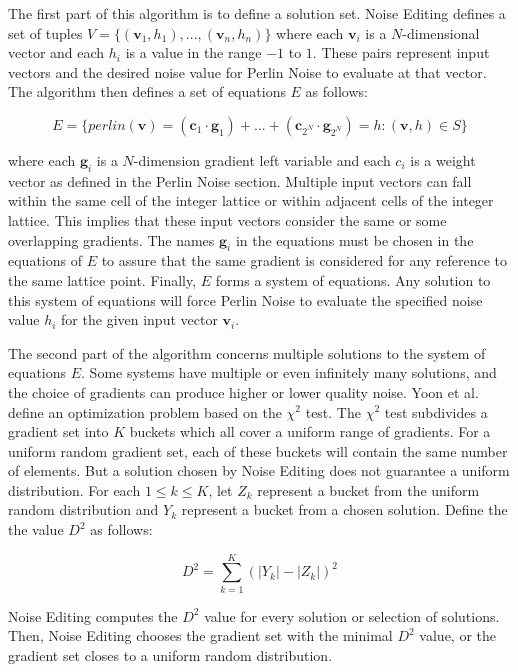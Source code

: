 \documentclass[12pt]{article}
\theoremstyle{definition}
\theoremstyle{remark}
\begin{document}
The first part of this algorithm is to define a solution set. Noise Editing defines a set of tuples $V = \{ (\textbf{v}_1, h_1), ..., (\textbf{v}_n, h_n) \}$ where each $\textbf{v}_i$ is a $N$-dimensional vector and each $h_i$ is a value in the range $-1$ to $1$. These pairs represent input vectors and the desired noise value for Perlin Noise to evaluate at that vector. The algorithm then defines a set of equations $E$ as follows:

\begin{equation*}
	E = \{ perlin(\textbf{v}) = (\textbf{c}_1 \cdot \textbf{g}_1) + ... + (\textbf{c}_{2^N} \cdot \textbf{g}_{2^N}) = h : (\textbf{v}, h) \in S \}
\end{equation*}

where each $\textbf{g}_i$ is a $N$-dimension gradient left variable and each $c_i$ is a weight vector as defined in the Perlin Noise section. Multiple input vectors can fall within the same cell of the integer lattice or within adjacent cells of the integer lattice. This implies that these input vectors consider the same or some overlapping gradients. The names $\textbf{g}_i$ in the equations must be chosen in the equations of $E$ to assure that the same gradient is considered for any reference to the same lattice point. Finally, $E$ forms a system of equations. Any solution to this system of equations will force Perlin Noise to evaluate the specified noise value $h_i$ for the given input vector $\textbf{v}_i$.

The second part of the algorithm concerns multiple solutions to the system of equations $E$. Some systems have multiple or even infinitely many solutions, and the choice of gradients can produce higher or lower quality noise. Yoon et al. define an optimization problem based on the $\chi^2$ test. The $\chi^2$ test subdivides a gradient set into $K$ buckets which all cover a uniform range of gradients. For a uniform random gradient set, each of these buckets will contain the same number of elements. But a solution chosen by Noise Editing does not guarantee a uniform distribution. For each $1 \leq k \leq K$, let $Z_k$ represent a bucket from the uniform random distribution and $Y_k$ represent a bucket from a chosen solution. Define the the value $D^2$ as follows:

\begin{equation*}
	D^2 = \sum_{k=1}^{K}(|Y_k| - |Z_k|)^2
\end{equation*}

Noise Editing computes the $D^2$ value for every solution or selection of solutions. Then, Noise Editing chooses the gradient set with the minimal $D^2$ value, or the gradient set closes to a uniform random distribution.
\end{document}
